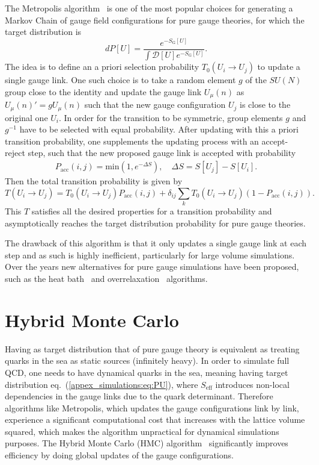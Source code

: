 The Metropolis algorithm~\citep{Metropolis:1953am} is one of the most popular choices for generating a Markov Chain of gauge field configurations for pure gauge theories, for which the target distribution is
\begin{equation}
dP[U]=\frac{e^{-S_{\textrm{G}}[U]}}{\int\mathcal{D}[U]e^{-S_{\textrm{G}}[U]}}.
\end{equation}
The idea is to define an a priori selection probability $T_0(U_i\rightarrow U_j)$ to update a single gauge link. One such choice is to take a random element $g$ of the $SU(N)$ group close to the identity and update the gauge link $U_{\mu}(n)$ as $U_{\mu}(n)'=gU_{\mu}(n)$ such that the new gauge configuration $U_j$ is close to the original one $U_i$. In order for the transition to be symmetric, group elements $g$ and $g^{-1}$ have to be selected with equal probability. After updating with this a priori transition probability, one supplements the updating process with an accept-reject step, such that the new proposed gauge link is accepted with probability
\begin{gather}
P_{\textrm{acc}}(i,j)=\textrm{min}\left(1,e^{-\Delta S}\right), \quad \Delta S=S[U_j]-S[U_i].
\end{gather}
Then the total transition probability is given by 
\begin{equation}
T(U_i\rightarrow U_j)=T_0(U_i\rightarrow U_j)P_{\textrm{acc}}(i,j)+\delta_{ij}\sum_kT_0(U_i\rightarrow U_j)(1-P_{\textrm{acc}}(i,j)).
\end{equation}
This $T$ satisfies all the desired properties for a transition probability and asymptotically reaches the target distribution probability for pure gauge theories.

The drawback of this algorithm is that it only updates a single gauge link at each step and as such is highly inefficient, particularly for large volume simulations. Over the years new alternatives for pure gauge simulations have been proposed, such as the heat bath~\citep{Creutz:1980zw} and overrelaxation~\citep{Adler:1981sn,Creutz:1987xi} algorithms.

\section{Hybrid Monte Carlo}

Having as target distribution that of pure gauge theory is equivalent as treating quarks in the sea as static sources (infinitely heavy). In order to simulate full QCD, one needs to have dynamical quarks in the sea, meaning having target distribution eq.~(\ref{appex_simulations:eq:PU}), where $S_{\textrm{eff}}$ introduces non-local dependencies in the gauge links due to the quark determinant. Therefore algorithms like Metropolis, which updates the gauge configurations link by link, experience a significant computational cost that increases with the lattice volume squared, which makes the algorithm unpractical for dynamical simulations purposes. The Hybrid Monte Carlo (HMC) algorithm~\citep{Duane:1987de,Gottlieb:1987mq} significantly improves efficiency by doing global updates of the gauge configurations.

